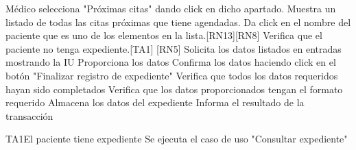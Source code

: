 \begin{UCtrayectoria}{Médico}
		\UCpaso[\UCactor] selecciona "Próximas citas" dando click en dicho apartado.
		\UCpaso Muestra un listado de todas las citas próximas que tiene agendadas. 
		\UCpaso[\UCactor] Da click en el nombre del paciente que es uno de los elementos en la lista.[RN13][RN8]
		\UCpaso Verifica que el paciente no tenga expediente.[TA1] [RN5]
		\UCpaso Solicita los datos listados en entradas mostrando la IU
		\UCpaso [\UCactor] Proporciona los datos
		\UCpaso [\UCactor] Confirma los datos haciendo click en el botón "Finalizar registro de expediente"
		\UCpaso Verifica que todos los datos requeridos hayan sido completados
		\UCpaso Verifica que los datos proporcionados tengan el formato requerido
		\UCpaso Almacena los datos del expediente 
		\UCpaso Informa el resultado de la transacción
\end{UCtrayectoria}

\begin{UCtrayectoriaA}{TA1}{El paciente tiene expediente}
	\UCpaso Se ejecuta el caso de uso  "Consultar expediente"
	
\end{UCtrayectoriaA}

